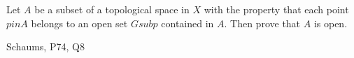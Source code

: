 \begin{samepage}
\begin{ex}
Let $A$ be a subset of a topological space in $X$ with the property that each point $p in A$ belongs to an open set $G sub p$ contained in $A$. 
Then prove that $A$ is open.
\end{ex}
\begin{source}
Schaums, P74, Q8
\end{source}
\end{samepage}
